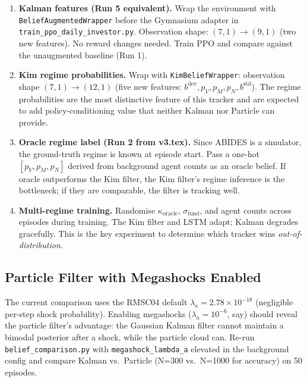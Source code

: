 \documentclass[11pt]{article}
\begin{document}
\begin{enumerate}[leftmargin=1.5em]
  \item \textbf{Kalman features (Run 5 equivalent).}
    Wrap the environment with \texttt{BeliefAugmentedWrapper} before the
    Gymnasium adapter in \texttt{train\_ppo\_daily\_investor.py}.
    Observation shape: $(7,1) \to (9,1)$ (two new features).
    No reward changes needed.
    Train PPO and compare against the unaugmented baseline (Run 1).

  \item \textbf{Kim regime probabilities.}
    Wrap with \texttt{KimBeliefWrapper}: observation shape $(7,1) \to (12,1)$
    (five new features: $b^{\text{dev}}, p_V, p_M, p_N, b^{\text{std}}$).
    The regime probabilities are the most distinctive feature of this tracker
    and are expected to add policy-conditioning value that neither Kalman nor
    Particle can provide.

  \item \textbf{Oracle regime label (Run 2 from v3.tex).}
    Since ABIDES is a simulator, the ground-truth regime is known at episode
    start.
    Pass a one-hot $[p_V, p_M, p_N]$ derived from background agent counts as
    an oracle belief.
    If oracle outperforms the Kim filter, the Kim filter's regime inference is
    the bottleneck; if they are comparable, the filter is tracking well.

  \item \textbf{Multi-regime training.}
    Randomise $\kappa_{\text{oracle}}$, $\sigma_{\text{fund}}$, and agent
    counts across episodes during training.
    The Kim filter and LSTM adapt; Kalman degrades gracefully.
    This is the key experiment to determine which tracker wins
    \emph{out-of-distribution}.
\end{enumerate}

\subsection{Particle Filter with Megashocks Enabled}

The current comparison uses the RMSC04 default
$\lambda_a = 2.78 \times 10^{-18}$ (negligible per-step shock probability).
Enabling megashocks ($\lambda_a = 10^{-6}$, say) should reveal the particle
filter's advantage: the Gaussian Kalman filter cannot maintain a bimodal
posterior after a shock, while the particle cloud can.
Re-run \texttt{belief\_comparison.py} with
\texttt{megashock\_lambda\_a} elevated in the background config and compare
Kalman vs.\ Particle (N=300 vs.\ N=1000 for accuracy) on 50 episodes.
\end{document}
